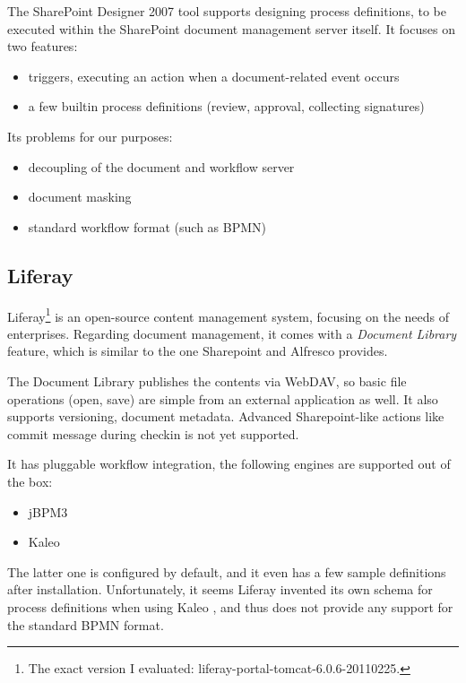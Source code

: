 The SharePoint Designer 2007 tool \cite{sp-designer} supports designing process definitions, to
be executed within the SharePoint document management server itself. It focuses on two features:

\begin{itemize}
\item triggers, executing an action when a document-related event occurs
\item a few builtin process definitions (review, approval, collecting signatures)
\end{itemize}

Its problems for our purposes:

\begin{itemize}
\item decoupling of the document and workflow server
\item document masking
\item standard workflow format (such as BPMN)
\end{itemize}

\subsection*{Liferay}

Liferay\footnote{The exact version I evaluated:
liferay-portal-tomcat-6.0.6-20110225.} \cite{liferay} is an open-source content management
system, focusing on the needs of enterprises. Regarding document management, it
comes with a \emph{Document Library} feature, which is similar to the one
Sharepoint and Alfresco provides.

The Document Library publishes the contents via WebDAV, so basic file
operations (open, save) are simple from an external application as well. It
also supports versioning, document metadata. Advanced Sharepoint-like actions
like commit message during checkin is not yet supported.

It has pluggable workflow integration, the following engines are supported out of the box:

\begin{itemize}
\item jBPM3
\item Kaleo
\end{itemize}

The latter one is configured by default, and it even has a few sample definitions
after installation. Unfortunately, it seems Liferay invented its own schema for process
definitions when using Kaleo \cite{liferay-kaleo}, and thus does not provide
any support for the standard BPMN format.

